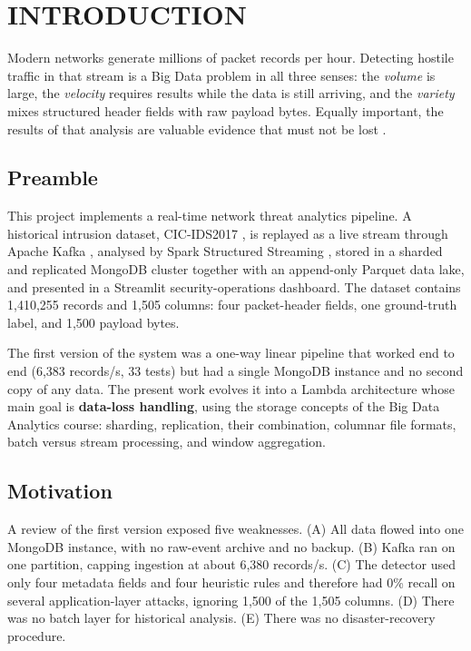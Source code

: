 \chapter{INTRODUCTION}

\justify
Modern networks generate millions of packet records per hour. Detecting hostile traffic in that stream is a Big Data problem in all three senses: the \emph{volume} is large, the \emph{velocity} requires results while the data is still arriving, and the \emph{variety} mixes structured header fields with raw payload bytes. Equally important, the results of that analysis are valuable evidence that must not be lost \cite{erl}.

\section{Preamble}
\justify
This project implements a real-time network threat analytics pipeline. A historical intrusion dataset, CIC-IDS2017 \cite{cicids}, is replayed as a live stream through Apache Kafka \cite{kafka}, analysed by Spark Structured Streaming \cite{structuredstreaming}, stored in a sharded and replicated MongoDB cluster \cite{mongodb} together with an append-only Parquet data lake, and presented in a Streamlit security-operations dashboard. The dataset contains 1,410,255 records and 1,505 columns: four packet-header fields, one ground-truth label, and 1,500 payload bytes.

The first version of the system was a one-way linear pipeline that worked end to end (6,383 records/s, 33 tests) but had a single MongoDB instance and no second copy of any data. The present work evolves it into a Lambda architecture \cite{lambda} whose main goal is \textbf{data-loss handling}, using the storage concepts of the Big Data Analytics course: sharding, replication, their combination, columnar file formats, batch versus stream processing, and window aggregation.

\section{Motivation}
\justify
A review of the first version exposed five weaknesses. (A) All data flowed into one MongoDB instance, with no raw-event archive and no backup. (B) Kafka ran on one partition, capping ingestion at about 6,380 records/s. (C) The detector used only four metadata fields and four heuristic rules and therefore had 0\% recall on several application-layer attacks, ignoring 1,500 of the 1,505 columns. (D) There was no batch layer for historical analysis. (E) There was no disaster-recovery procedure.

